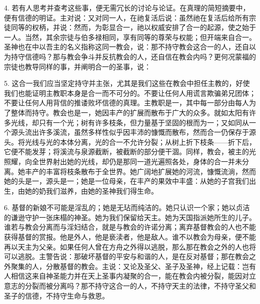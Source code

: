 4. 若有人思考并查考这些事，便无需冗长的讨论与论证。在真理的简短摘要中，便有信德的明证。主对说：又对同一人，在祂复活后说：虽然祂在复活后给所有宗徒同等的权柄，并说：然而，为彰显合一，祂以权威安排了合一的起源，使之始于一人。当然，其余宗徒与伯多禄相同，享有同等的尊荣与权能；但开端来自合一。圣神也在中以吾主的名义指称这同一教会，说：那不持守教会这合一的人，还自以为持守信德吗？那与教会争斗并反抗教会的人，还自信在教会内吗？更何况蒙福的宗徒也教导同样的事，并阐明合一的圣事，说：\par

5. 这合一我们应当坚定持守并主张，尤其是我们这些在教会中担任主教的，好使我们也能证明主教职本身是合一而不可分的。不要让任何人用谎言欺骗弟兄团体；不要让任何人用背信的推诿败坏信德的真理。主教职是一，其中每一部分由每人为了整体而持守。教会也是一，她因丰产的扩展而散布于广大的众多。就如太阳有许多光线，却只有一个光；树有许多枝条，但力量基于坚固的根而为一；又如同从一个源头流出许多溪流，虽然多样性似乎因丰沛的慷慨而散布，然而合一仍保存于源头。将光线与光的本体分离，光的合一不允许分裂；从树上折下枝条——折下后，它便不能发芽；将溪流与泉源截断，被截断的部分便干涸。同样，教会，被主的光照耀，向全世界射出她的光线，却仍是那同一道光遍照各处，身体的合一并未分离。她丰产的丰富将枝条散布于全世界。她广阔地扩展她的河流，慷慨流淌，然而她的头是一，源头是一；她是一位母亲，在丰产的果效中丰盛：从她的子宫我们出生，由她的奶我们滋养，由她的圣神我们得生命。\par

6. 基督的新娘不可能是淫乱的；她是无玷而纯洁的。她只认识一个家；她以贞洁的谦逊守护一张床榻的神圣。她为我们保留给天主。她为天国指派她所生的儿子。谁若与教会分离而与淫妇结合，就是与教会的许诺分离；离弃基督教会的人也不能获得基督的赏报。他是外人，他是亵渎者，他是敌人。谁不以教会为母亲，便不能再以天主为父亲。如果任何人曾在方舟之外得以逃脱，那么那在教会之外的人也将可以逃脱。主警告说：那破坏基督的平安与和谐的人，是在反对基督；那在教会之外聚集的人，分散基督的教会。主说：又论及圣父、圣子及圣神，经上记载：岂有人相信这来自神圣能力并在天上圣事内凝聚的合一，能在教会内被分裂，能因对立意志的分裂而被分离吗？那不持守这合一的人，不持守天主的法律，不持守圣父和圣子的信德，不持守生命与救恩。\par

